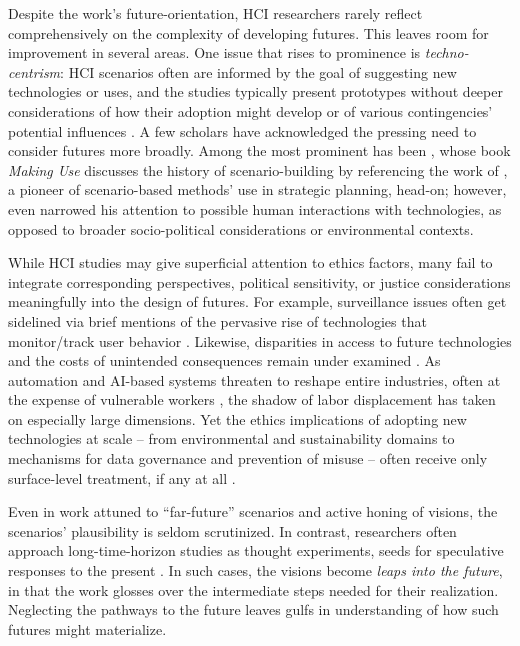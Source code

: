 Despite the work's future-orientation, HCI researchers rarely reflect comprehensively on the complexity of developing futures. This leaves room for improvement in several areas. One issue that rises to prominence is \emph{techno-centrism}: HCI scenarios often are informed by the goal of suggesting new technologies or uses, and the studies typically present prototypes without deeper considerations of how their adoption might develop or of various contingencies' potential influences \cite{lindley_implications_2017,pargmanSustainabilityImaginedFuture2017}. A few scholars have acknowledged the pressing need to consider futures more broadly. Among the most prominent has been \citeauthor{carroll_making_2003}, whose book \emph{Making Use} \cite{carroll_making_2003} discusses the history of scenario-building by referencing the work of \citeauthor{kahn1962thinking} \cite{kahn1962thinking}, a pioneer of scenario-based methods' use in strategic planning, head-on; however, even \citeauthor{carroll_making_2003} narrowed his attention to possible human interactions with technologies, as opposed to broader socio-political considerations or environmental contexts.



While HCI studies may give superficial attention to ethics factors, many fail to integrate corresponding perspectives, political sensitivity, or justice considerations meaningfully into the design of futures. For example, surveillance issues often get sidelined via brief mentions of the pervasive rise of technologies that monitor/track user behavior \cite{zuboff2015bigother}. Likewise, disparities in access to future technologies and the costs of unintended consequences remain under examined \cite{benjamin2019raceaftertechnology}. As automation and AI-based systems threaten to reshape entire industries, often at the expense of vulnerable workers \cite{eubanks2018automatinginequality}, the shadow of labor displacement has taken on especially large dimensions. Yet the ethics implications of adopting new technologies at scale -- from environmental and sustainability domains to mechanisms for data governance and prevention of misuse -- often receive only surface-level treatment, if any at all \cite{jasanoff2016dreamscapes}.


Even in work attuned to ``far-future'' scenarios and active honing of visions, the scenarios' plausibility is seldom scrutinized. In contrast, researchers often approach long-time-horizon studies as thought experiments, seeds for speculative responses to the present \cite{coulton2017design,wong2016when,blythe_research_2014}. In such cases, the visions become \emph{leaps into the future}, in that the work glosses over the intermediate steps needed for their realization. Neglecting the pathways to the future leaves gulfs in understanding of how such futures might materialize.      

